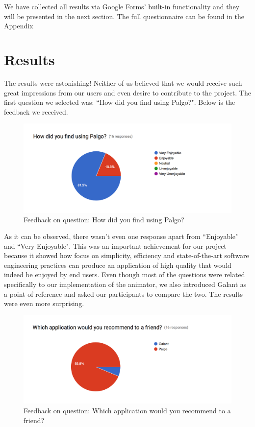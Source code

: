 \documentclass{l4proj}
\begin{document}
We have collected all results via Google Forms' built-in functionality and they will be presented in the next section.
The full questionnaire can be found in the Appendix

\section{Results}

The results were astonishing! Neither of us believed that we would receive such great impressions from our users and
even desire to contribute to the project. The first question we selected was: ``How did you find using Palgo?". Below is
the feedback we received.

\begin{figure}[!ht]
    \centering
    \includegraphics[scale=0.6]{questionnaire-1}
    \caption{Feedback on question: How did you find using Palgo?}
    \label{fig:questionnaire-1}
\end{figure}

As it can be observed, there wasn't even one response apart from ``Enjoyable" and ``Very Enjoyable". This was an
important achievement for our project because it showed how focus on simplicity, efficiency and state-of-the-art
software engineering practices
can produce an application of high quality that would indeed be enjoyed by end users. Even though most of the questions
were related specifically to our implementation of the animator, we also introduced Galant as a point of reference and
asked our participants to compare the two. The results were even more surprising.

\begin{figure}[!ht]
    \centering
    \includegraphics[scale=0.6]{questionnaire-2}
    \caption{Feedback on question: Which application would you recommend to a friend?}
    \label{fig:questionnaire-2}
\end{figure}
\end{document}
